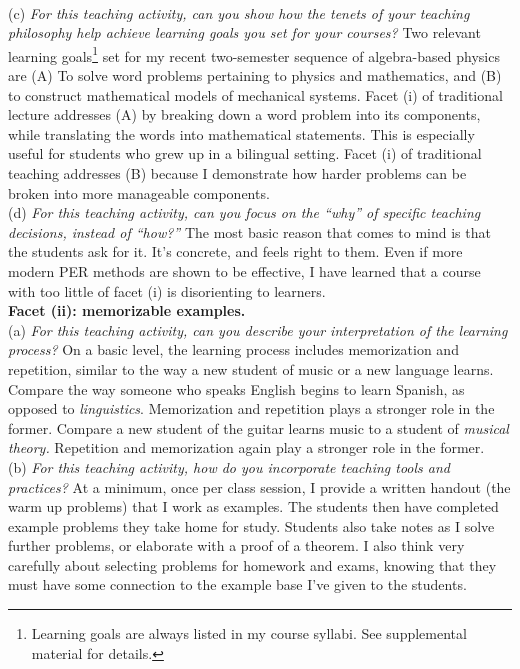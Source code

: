\documentclass[../../../main.tex]{subfiles}
\begin{document}
\\
\vspace{0.25cm}
(c) \textit{For this teaching activity, can you show how the tenets of your teaching philosophy help achieve learning goals you set for your courses?} Two relevant learning goals\footnote{Learning goals are always listed in my course syllabi.  See supplemental material for details.} set for my recent two-semester sequence of algebra-based physics are (A) To solve word problems pertaining to physics and mathematics, and (B) to construct mathematical models of mechanical systems.  Facet (i) of traditional lecture addresses (A) by breaking down a word problem into its components, while translating the words into mathematical statements.  This is especially useful for students who grew up in a bilingual setting.  Facet (i) of traditional teaching addresses (B) because I demonstrate how harder problems can be broken into more manageable components.
\\
\vspace{0.25cm}
(d) \textit{For this teaching activity, can you focus on the ``why'' of specific teaching decisions, instead of ``how?''}  The most basic reason that comes to mind is that the students ask for it.  It's concrete, and feels right to them.  Even if more modern PER methods are shown to be effective, I have learned that a course with too little of facet (i) is disorienting to learners.
\\
\vspace{0.25cm}
\textbf{Facet (ii): memorizable examples.}
\\
\vspace{0.25cm}
(a) \textit{For this teaching activity, can you describe your interpretation of the learning process?} On a basic level, the learning process includes memorization and repetition, similar to the way a new student of music or a new language learns.  Compare the way someone who speaks English begins to learn Spanish, as opposed to \textit{linguistics}.  Memorization and repetition plays a stronger role in the former.  Compare a new student of the guitar learns music to a student of \textit{musical theory.}  Repetition and memorization again play a stronger role in the former.
\\
\vspace{0.25cm}
(b) \textit{For this teaching activity, how do you incorporate teaching tools and practices?}  At a minimum, once per class session, I provide a written handout (the warm up problems) that I work as examples.  The students then have completed example problems they take home for study.  Students also take notes as I solve further problems, or elaborate with a proof of a theorem.  I also think very carefully about selecting problems for homework and exams, knowing that they must have some connection to the example base I've given to the students.
\end{document}
